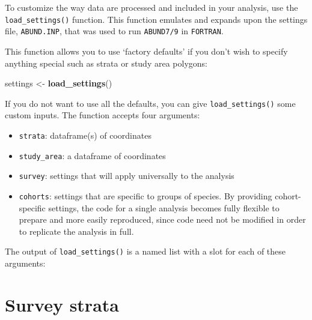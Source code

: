 \documentclass[
]{book}
\newenvironment{Shaded}{\begin{snugshade}}{\end{snugshade}}
\newcommand{\DecValTok}[1]{\textcolor[rgb]{0.00,0.00,0.81}{#1}}
\newcommand{\KeywordTok}[1]{\textcolor[rgb]{0.13,0.29,0.53}{\textbf{#1}}}
\newcommand{\NormalTok}[1]{#1}
\newcommand{\OperatorTok}[1]{\textcolor[rgb]{0.81,0.36,0.00}{\textbf{#1}}}
\newcommand{\StringTok}[1]{\textcolor[rgb]{0.31,0.60,0.02}{#1}}
\begin{document}
To customize the way data are processed and included in your analysis, use the \texttt{load\_settings()} function. This function emulates and expands upon the settings file, \texttt{ABUND.INP}, that was used to run \texttt{ABUND7/9} in \texttt{FORTRAN}.

This function allows you to use `factory defaults' if you don't wish to specify anything special such as strata or study area polygons:

\begin{Shaded}
\begin{Highlighting}[]
\NormalTok{settings <-}\StringTok{ }\KeywordTok{load_settings}\NormalTok{()}
\end{Highlighting}
\end{Shaded}

If you do not want to use all the defaults, you can give \texttt{load\_settings()} some custom inputs. The function accepts four arguments:

\begin{itemize}
\item
  \texttt{strata}: dataframe(s) of coordinates
\item
  \texttt{study\_area}: a dataframe of coordinates
\item
  \texttt{survey}: settings that will apply universally to the analysis
\item
  \texttt{cohorts}: settings that are specific to groups of species. By providing cohort-specific settings, the code for a single analysis becomes fully flexible to prepare and more easily reproduced, since code need not be modified in order to replicate the analysis in full.
\end{itemize}

The output of \texttt{load\_settings()} is a named list with a slot for each of these arguments:

\begin{Shaded}
\end{Shaded}

\hypertarget{survey-strata}{%
\section*{Survey strata}\label{survey-strata}}
\end{document}
